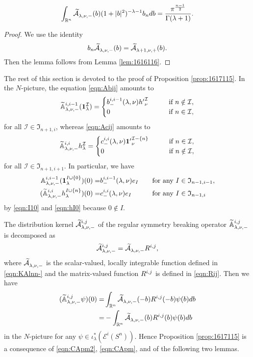 \begin{lemma}
\label{lem:Abnint}
\[
\int_{{\mathbb{R}}^n} \widetilde{{\mathcal{A}}}_{{\lambda},{\nu},{-}}^{{}}(b) (1+|b|^2)^{-\lambda-1}b_n d b
=
\frac{\pi^{\frac{n-1}{2}}}{\Gamma(\lambda+1)}.  
\]
\end{lemma}
\begin{proof}
We use the identity
\[ 
   b_n \widetilde{{\mathcal{A}}}_{{\lambda},{\nu},{-}}^{{}}(b)=\widetilde{{\mathcal{A}}}_{{\lambda+1},{\nu},{+}}^{{}}(b).  
\]
Then the lemma follows from Lemma \ref{lem:1616116}.  
\end{proof}
The rest of this section is devoted to the proof
 of Proposition \ref{prop:1617115}.  
In the $N$-picture, 
 the equation \eqref{eqn:Abij} amounts to 
\[
{\widetilde{\mathbb{A}}}_{{\lambda},{\nu},{-}}^{{i,i-1}} ({\bf{1}}_{\lambda}^{{\mathcal{I}}})
=
\begin{cases}
b_-^{i,i-1}(\lambda,\nu) {h'}_{\nu}^{{\mathcal{I}}}
\qquad
&\text{if}\ n \notin {\mathcal{I}}, 
\\
0
\qquad
&\text{if}\ n \in {\mathcal{I}}, 
\end{cases}
\]
for all ${\mathcal{I}} \in {\mathfrak{I}}_{n+1,i}$, 
 whereas \eqref{eqn:Acij} amounts to 
\[
{\widetilde{\mathbb{A}}}_{{\lambda},{\nu},{-}}^{{i,i}} h_{\lambda}^{\mathcal{I}}
=
\begin{cases}
c_-^{i,i}(\lambda,\nu) {{\bf{1}}'}_{\nu}^{{\mathcal{I}} - \{n\}}
\qquad
&\text{if}\ n \in {\mathcal{I}}, 
\\
0
\qquad
&\text{if}\ n \notin {\mathcal{I}}, 
\end{cases}
\]
for all ${\mathcal{I}} \in {\mathfrak{I}}_{n+1,i+1}$.  
In particular, 
 we have
\begin{alignat}{2}
\label{eqn:CApm2}
{\mathbb{A}}_{{\lambda},{\nu},{-}}^{{i,i-1}} 
({\bf{1}}_{\lambda}^{I \cup \{0\}})(0)
=&
b_-^{i,i-1}(\lambda,\nu) e_{I}
\quad
&&\text{for any $I \in {\mathfrak{I}}_{n-1,i-1}$}, 
\\
\label{eqn:CApm}
({\widetilde{\mathbb{A}}}_{{\lambda},{\nu},{-}}^{{i,i}} h_{\lambda}^{I \cup \{n\}})(0)
=&
c_-^{i,i}(\lambda,\nu) e_I
\quad
&&\text{for any $I \in {\mathfrak{I}}_{n-1,i}$}
\end{alignat}
by \eqref{eqn:I10} and \eqref{eqn:hI0}
 because $0 \notin I$.  



The distribution kernel $\widetilde{{\mathcal{A}}}_{{\lambda},{\nu},{-}}^{{i,j}}$
 of the regular symmetry breaking operator
 ${\widetilde{\mathbb{A}}}_{{\lambda},{\nu},{-}}^{{i,j}}$ is decomposed as
\[
   \widetilde{{\mathcal{A}}}_{{\lambda},{\nu},{-}}^{{i,j}} = \widetilde{{\mathcal{A}}}_{{\lambda},{\nu},{-}}^{{}} R^{{i},{j}}, 
\]
 where
 $\widetilde{{\mathcal{A}}}_{{\lambda},{\nu},{-}}^{{}}$ is the scalar-valued, 
locally integrable function defined
 in \eqref{eqn:KAlnn-}
 and the matrix-valued function 
 $R^{{i},{j}}$ is defined in \eqref{eqn:Rij}.  
Then we have
\begin{align*}
({\widetilde{\mathbb{A}}}_{{\lambda},{\nu},{-}}^{{i,j}} \psi)(0)
=&\int_{\mathbb{R}^n} \widetilde{{\mathcal{A}}}_{{\lambda},{\nu},{-}}^{{}}(-b) R^{{i},{j}} (-b)\psi(b) d b
\\
=&-\int_{\mathbb{R}^n} \widetilde{{\mathcal{A}}}_{{\lambda},{\nu},{-}}^{{}}(b) R^{{i},{j}} (b)\psi(b) d b
\end{align*}
in the $N$-picture for any $\psi \in \iota_{\lambda}^{\ast}({\mathcal{E}}^i(S^n))$.  
Hence Proposition \ref{prop:1617115} is a consequence
 of \eqref{eqn:CApm2}, \eqref{eqn:CApm}, 
 and of the following two lemmas.  

